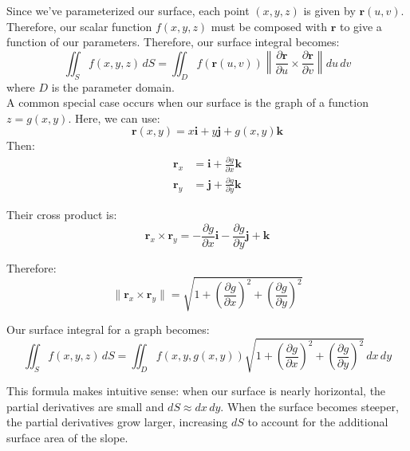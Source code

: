 \noindent Since we've parameterized our surface, each point $(x,y,z)$ is given by $\mathbf{r}(u,v)$. Therefore, our scalar function $f(x,y,z)$ must be composed with $\mathbf{r}$ to give a function of our parameters. Therefore, our surface integral becomes:
\[
\iint_S f(x,y,z)\,dS = \iint_D f(\mathbf{r}(u,v))\left\|\frac{\partial \mathbf{r}}{\partial u} \times \frac{\partial \mathbf{r}}{\partial v}\right\|du\,dv
\]
where $D$ is the parameter domain. \\

\noindent A common special case occurs when our surface is the graph of a function $z = g(x,y)$. Here, we can use:
\[
\mathbf{r}(x,y) = x\mathbf{i} + y\mathbf{j} + g(x,y)\mathbf{k}
\]
Then:
\begin{align*}
\mathbf{r}_x &= \mathbf{i} + \frac{\partial g}{\partial x}\mathbf{k} \\
\mathbf{r}_y &= \mathbf{j} + \frac{\partial g}{\partial y}\mathbf{k}
\end{align*}

\noindent Their cross product is:
\[
\mathbf{r}_x \times \mathbf{r}_y = -\frac{\partial g}{\partial x}\mathbf{i} - \frac{\partial g}{\partial y}\mathbf{j} + \mathbf{k}
\]

\noindent Therefore:
\[
\|\mathbf{r}_x \times \mathbf{r}_y\| = \sqrt{1 + \left(\frac{\partial g}{\partial x}\right)^2 + \left(\frac{\partial g}{\partial y}\right)^2}
\]

\noindent Our surface integral for a graph becomes:
\[
\iint_S f(x,y,z)\,dS = \iint_D f(x,y,g(x,y))\sqrt{1 + \left(\frac{\partial g}{\partial x}\right)^2 + \left(\frac{\partial g}{\partial y}\right)^2}\,dx\,dy
\]

\noindent This formula makes intuitive sense: when our surface is nearly horizontal, the partial derivatives are small and $dS \approx dx\,dy$. When the surface becomes steeper, the partial derivatives grow larger, increasing $dS$ to account for the additional surface area of the slope.


